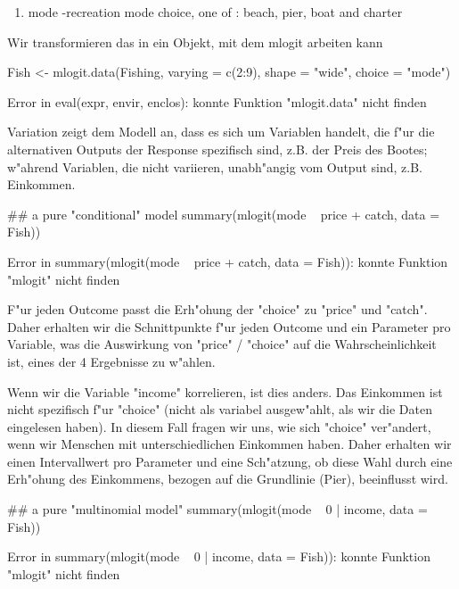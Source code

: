 \documentclass[a4paper,twoside]{tufte-book}\usepackage[]{graphicx}\usepackage[]{color}
\begin{document}
\begin{appendices}
\begin{enumerate}
\item mode -recreation mode choice, one of : beach, pier, boat and charter

\end{enumerate}

Wir transformieren das in ein Objekt, mit dem mlogit arbeiten kann

\begin{Schunk}
\begin{Sinput}
Fish <- mlogit.data(Fishing, varying = c(2:9), shape = "wide", choice = "mode")
\end{Sinput}
\begin{Soutput}
Error in eval(expr, envir, enclos): konnte Funktion "mlogit.data" nicht finden
\end{Soutput}
\end{Schunk}

Variation zeigt dem Modell an, dass es sich um Variablen handelt, die f"ur die alternativen Outputs der Response spezifisch sind, z.B. der Preis des Bootes; w"ahrend Variablen, die nicht variieren, unabh"angig vom Output sind, z.B. Einkommen.

\begin{Schunk}
\begin{Sinput}
## a pure "conditional" model
summary(mlogit(mode ~ price + catch, data = Fish))
\end{Sinput}
\begin{Soutput}
Error in summary(mlogit(mode ~ price + catch, data = Fish)): konnte Funktion "mlogit" nicht finden
\end{Soutput}
\end{Schunk}

F"ur jeden Outcome passt die Erh"ohung der "choice" zu "price" und "catch". Daher erhalten wir die Schnittpunkte f"ur jeden Outcome und ein Parameter pro Variable, was die Auswirkung von "price" / "choice" auf die Wahrscheinlichkeit ist, eines der 4 Ergebnisse zu w"ahlen.

Wenn wir die Variable "income" korrelieren, ist dies anders. Das Einkommen ist nicht spezifisch f"ur "choice" (nicht als variabel ausgew"ahlt, als wir die Daten eingelesen haben). In diesem Fall fragen wir uns, wie sich "choice" ver"andert, wenn wir Menschen mit unterschiedlichen Einkommen haben. Daher erhalten wir einen Intervallwert pro Parameter und eine Sch"atzung, ob diese Wahl durch eine Erh"ohung des Einkommens, bezogen auf die Grundlinie (Pier), beeinflusst wird.

\begin{Schunk}
\begin{Sinput}
## a pure "multinomial model"
summary(mlogit(mode ~ 0 | income, data = Fish))
\end{Sinput}
\begin{Soutput}
Error in summary(mlogit(mode ~ 0 | income, data = Fish)): konnte Funktion "mlogit" nicht finden
\end{Soutput}
\end{Schunk}


\end{appendices}
\end{document}
